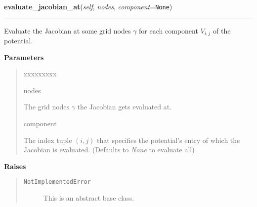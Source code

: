 \hspace{.8\funcindent}\begin{boxedminipage}{\funcwidth}

    \raggedright \textbf{evaluate\_jacobian\_at}(\textit{self}, \textit{nodes}, \textit{component}={\tt None})

    \vspace{-1.5ex}

    \rule{\textwidth}{0.5\fboxrule}
\setlength{\parskip}{2ex}
    Evaluate the Jacobian at some grid nodes $\gamma$ for
    each component $V_{i,j}$ of the potential.

\setlength{\parskip}{1ex}
      \textbf{Parameters}
      \vspace{-1ex}

      \begin{quote}
        \begin{Ventry}{xxxxxxxxx}

          \item[nodes]

          The grid nodes $\gamma$ the Jacobian gets
          evaluated at.

          \item[component]

          The index tuple $\left(i,j \right)$ that specifies
          the potential's entry of which the Jacobian is evaluated.
          (Defaults to \textit{None} to evaluate all)

        \end{Ventry}

      \end{quote}

      \textbf{Raises}
    \vspace{-1ex}

      \begin{quote}
        \begin{description}

          \item[\texttt{NotImplementedError}]

          This is an abstract base class.

        \end{description}

      \end{quote}

    \end{boxedminipage}

    \label{MatrixPotential:MatrixPotential:calculate_hessian}

